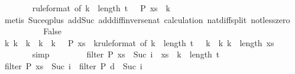 \begin{isabellebody}
\ \ \ \ \ \ \isamarkupfalse%
\ {\isacharasterisk}{\isacharbrackleft}rule{\isacharunderscore}format{\isacharcomma}\ of\ {\isachardoublequoteopen}k{\isacharprime}\ {\isacharminus}\ {\isacharparenleft}length\ {\isacharquery}t\ {\isacharplus}\ {}{\isacharparenright}{\isachardoublequoteclose}{\isacharbrackright}\ {\isacharbackquoteopen}P\ {\isacharparenleft}xs\ {\isacharbang}\ k{\isacharprime}{\isacharparenright}{\isacharbackquoteclose}\isanewline
\ \ \ \ \ \ \isamarkupfalse%
\ {\isacharparenleft}metis\ Suc{\isacharunderscore}eq{\isacharunderscore}plus{}\ add{\isacharunderscore}Suc\ add{\isacharunderscore}diff{\isacharunderscore}inverse{\isacharunderscore}nat\ calculation{\isacharparenleft}{}{\isacharparenright}\ nat{\isacharunderscore}diff{\isacharunderscore}split\ not{\isacharunderscore}less{\isacharunderscore}zero{\isacharparenright}\isanewline
\ \ \ \ \isamarkupfalse%
\isanewline
\ \ \ \ \isamarkupfalse%
\ False\isanewline
\ \ \ \ \ \ \isamarkupfalse%
\ {\isacharbackquoteopen}{\isasymforall}k{\isacharprime}{\isachardot}\ k{}\ {\isacharless}\ k{\isacharprime}\ {\isasymand}\ k{\isacharprime}\ {\isacharless}\ k{}\ {\isasymlongrightarrow}\ {\isasymnot}\ P\ {\isacharparenleft}{\isacharquery}xs\ {\isacharbang}\ k{\isacharprime}{\isacharparenright}{\isacharbackquoteclose}{\isacharbrackleft}rule{\isacharunderscore}format{\isacharcomma}\ of\ {\isachardoublequoteopen}k{\isacharprime}\ {\isacharminus}\ {\isacharparenleft}length\ {\isacharquery}t\ {\isacharplus}\ {}{\isacharparenright}{\isachardoublequoteclose}{\isacharbrackright}\ {\isacharbackquoteopen}k{}\ {\isacharless}\ k{}{\isacharbackquoteclose}\ {\isacharbackquoteopen}k{}\ {\isacharless}\ length\ {\isacharquery}xs{\isacharbackquoteclose}\isanewline
\ \ \ \ \ \ \isamarkupfalse%
\ simp\isanewline
\ \ \isamarkupfalse%
\isanewline
\ \ \ \ \isamarkupfalse%
\ {\isachardoublequoteopen}filter\ P\ xs\ {\isacharbang}\ {\isacharparenleft}Suc\ i{\isacharparenright}\ {\isacharequal}\ xs\ {\isacharbang}\ {\isacharparenleft}k{}\ {\isacharplus}\ length\ {\isacharquery}t\ {\isacharplus}\ {}{\isacharparenright}{\isachardoublequoteclose}\isanewline
\ \ \ \ \isamarkupfalse%
{\isacharminus}\isanewline
\ \ \ \ \ \ \isamarkupfalse%
\ {\isachardoublequoteopen}filter\ P\ xs\ {\isacharbang}\ {\isacharparenleft}Suc\ i{\isacharparenright}\ {\isacharequal}\ filter\ P\ {\isacharquery}d\ {\isacharbang}\ {\isacharparenleft}Suc\ i{\isacharparenright}{\isachardoublequoteclose}\isanewline

\end{isabellebody}
